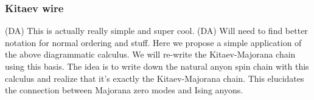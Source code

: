 \documentclass[12pt,a4paper]{article}
\newcommand{\dave}[1]{{\color{ao(english)}\footnotesize{(DA) #1}}}
\newcommand{\remove}[1]{{\color{amber(sae/ece)}\footnotesize{(RM?) #1}}}
\newcommand{\ethan}[1]{{\color{amethyst}\footnotesize{(EL) #1}}}
\begin{document}


\subsubsection{Kitaev wire}
\dave{This is actually really simple and super cool.}
\dave{Will need to find better notation for normal ordering and stuff.}
Here we propose a simple application of the above diagrammatic calculus. 
We will re-write the Kitaev-Majorana chain using this basis. 
The idea is to write down the natural anyon spin chain with this calculus and realize that it's exactly the Kitaev-Majorana chain. 
This elucidates the connection between Majorana zero modes and Ising anyons. 
\end{document}
